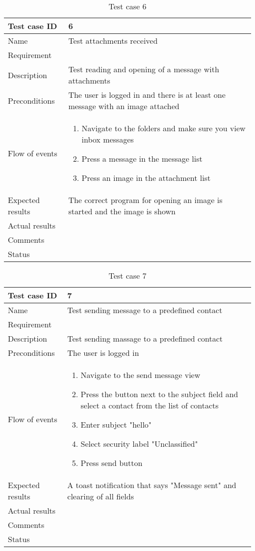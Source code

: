 \begin{table}
\begin{tabular}{l|p{10cm}}
Test case ID & 6 \\ \hline
Name & Test attachments received\\ \hline
Requirement & \\ \hline
Description & Test reading and opening of a message with attachments\\ \hline
Preconditions & The user is logged in and there is at least one message with an image attached\\ \hline
Flow of events & 
\begin{enumerate}
\item{}Navigate to the folders and make sure you view inbox messages
\item{}Press a message in the message list
\item{}Press an image in the attachment list
\end{enumerate} \\ \hline
Expected results & The correct program for opening an image is started and the image is shown\\ \hline \hline
Actual results & \\ \hline
Comments & \\ \hline
Status & 
\end{tabular}
\caption{Test case 6} \label{tab:case6}
\end{table}

\begin{table}
\begin{tabular}{l|p{10cm}}
Test case ID & 7 \\ \hline
Name & Test sending message to a predefined contact\\ \hline
Requirement & \\ \hline
Description & Test sending massage to a predefined contact\\ \hline
Preconditions & The user is logged in\\ \hline
Flow of events & 
\begin{enumerate}
\item{}Navigate to the send message view
\item{}Press the button next to the subject field and select a contact from the list of contacts
\item{}Enter subject "hello"
\item{}Select security label "Unclassified"
\item{}Press send button
\end{enumerate} \\ \hline
Expected results & A toast notification that says "Message sent" and clearing of all fields\\ \hline \hline
Actual results & \\ \hline
Comments & \\ \hline
Status & 
\end{tabular}
\caption{Test case 7} \label{tab:case7}
\end{table}

